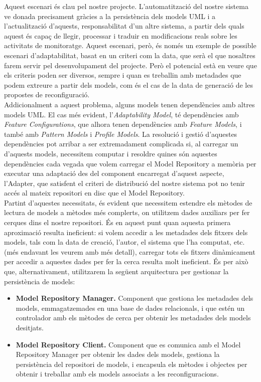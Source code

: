 Aquest escenari és clau pel nostre projecte. L'automatització del nostre sistema ve donada precisament gràcies a la persistència dels models UML i a l'actualització d'aquests, responsabilitat d'un altre sistema, a partir dels quals aquest és capaç de llegir, processar i traduir en modificacions reals sobre les activitats de monitoratge. Aquest escenari, però, és només un exemple de possible escenari d'adaptabilitat, basat en un criteri com la data, que serà el que nosaltres farem servir pel desenvolupament del projecte. Però el potencial està en veure que els criteris poden ser diversos, sempre i quan es treballin amb metadades que podem extreure a partir dels models, com és el cas de la data de generació de les propostes de reconfiguració.\\

Addicionalment a aquest problema, alguns models tenen dependències amb altres models UML. El cas més evident, l'\textit{Adaptability Model}, té dependències amb \textit{Feature Configurations}, que alhora tenen dependències amb \textit{Feature Models}, i també amb \textit{Pattern Models} i \textit{Profile Models}. La resolució i gestió d'aquestes dependències pot arribar a ser extremadament complicada si, al carregar un d'aquests models, necessitem computar i resoldre quines són aquestes dependències cada vegada que volem carregar el Model Repository a memòria per executar una adaptació des del component encarregat d'aquest aspecte, l'Adapter, que satisfent el criteri de distribució del nostre sistema pot no tenir accés al mateix repositori en disc que el Model Repository. \\

Partint d'aquestes necessitats, és evident que necessitem estendre els mètodes de lectura de models a mètodes més complerts, on utilitzem dades auxiliars per fer cerques dins el nostre repositori. És en aquest punt quan aquesta primera aproximació resulta ineficient: si volem accedir a les metadades dels fitxers dels models, tals com la data de creació, l'autor, el sistema que l'ha computat, etc. (més endavant les veurem amb més detall), carregar tots els fitxers dinàmicament per accedir a aquestes dades per fer la cerca resulta molt ineficient. És per això que, alternativament, utilitzarem la següent arquitectura per gestionar la persistència de models:

\begin{itemize}
\item \textbf{Model Repository Manager.} Component que gestiona les metadades dels models, emmagatzemades en una base de dades relacionals, i que estén un controlador amb els mètodes de cerca per obtenir les metadades dels models desitjats.
\item \textbf{Model Repository Client.} Component que es comunica amb el Model Repository Manager per obtenir les dades dels models, gestiona la persistència del repositori de models, i encapsula els mètodes i objectes per obtenir i treballar amb els models associats a les reconfiguracions.
\end{itemize}

